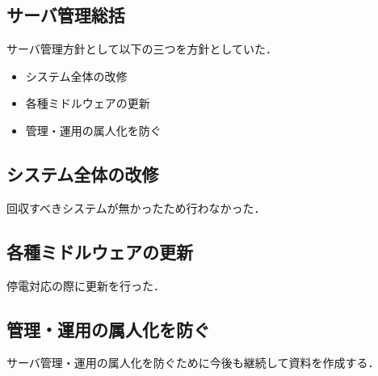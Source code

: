 \subsection*{サーバ管理総括}


サーバ管理方針として以下の三つを方針としていた．
\begin{itemize}
    \item システム全体の改修
    \item 各種ミドルウェアの更新
    \item 管理・運用の属人化を防ぐ
\end{itemize}

\subsection*{システム全体の改修}
回収すべきシステムが無かったため行わなかった．

\subsection*{各種ミドルウェアの更新}
停電対応の際に更新を行った．

\subsection*{管理・運用の属人化を防ぐ}
サーバ管理・運用の属人化を防ぐために今後も継続して資料を作成する．
